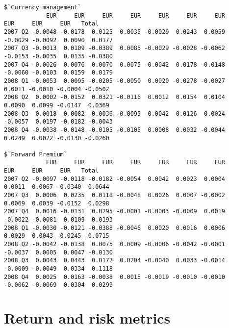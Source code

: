 \documentclass[11pt,a4paper]{article}
\begin{document}
\begin{verbatim}
$`Currency management`
            EUR     EUR     EUR     EUR     EUR     EUR     EUR     EUR     EUR     EUR   Total
2007 Q2 -0.0048 -0.0178  0.0125  0.0035 -0.0029  0.0243  0.0059 -0.0029 -0.0092  0.0090  0.0177
2007 Q3 -0.0013  0.0109 -0.0389  0.0085 -0.0029 -0.0028 -0.0062 -0.0153 -0.0035  0.0135 -0.0380
2007 Q4 -0.0026  0.0076  0.0070  0.0075 -0.0042  0.0178 -0.0148 -0.0060 -0.0103  0.0159  0.0179
2008 Q1 -0.0053  0.0095 -0.0205 -0.0050  0.0020 -0.0278 -0.0027  0.0011 -0.0010 -0.0004 -0.0502
2008 Q2  0.0002 -0.0152  0.0321 -0.0116  0.0012  0.0154  0.0104  0.0090  0.0099 -0.0147  0.0369
2008 Q3  0.0018 -0.0082 -0.0036 -0.0095  0.0042  0.0126  0.0024 -0.0057  0.0197 -0.0182 -0.0043
2008 Q4 -0.0038 -0.0148 -0.0105 -0.0105  0.0008  0.0032 -0.0044  0.0249  0.0022 -0.0130 -0.0260

$`Forward Premium`
            EUR     EUR     EUR     EUR     EUR     EUR     EUR     EUR     EUR     EUR   Total
2007 Q2 -0.0097 -0.0118 -0.0182 -0.0054  0.0042  0.0023  0.0004  0.0011  0.0067 -0.0340 -0.0644
2007 Q3  0.0006  0.0235  0.0118 -0.0048  0.0026  0.0007 -0.0002  0.0069  0.0039 -0.0152  0.0298
2007 Q4  0.0016 -0.0131  0.0295 -0.0001 -0.0003 -0.0009  0.0019 -0.0022 -0.0081  0.0109  0.0193
2008 Q1 -0.0030 -0.0121 -0.0388 -0.0046  0.0020  0.0016  0.0006  0.0029  0.0043 -0.0245 -0.0715
2008 Q2 -0.0042 -0.0138  0.0075  0.0009 -0.0006 -0.0042 -0.0001 -0.0037  0.0005  0.0047 -0.0130
2008 Q3  0.0043  0.0443  0.0172  0.0204 -0.0040  0.0033 -0.0014 -0.0009 -0.0049  0.0334  0.1118
2008 Q4  0.0025  0.0163 -0.0038  0.0015 -0.0019 -0.0010 -0.0010 -0.0062 -0.0069  0.0304  0.0299
\end{verbatim}
\endgroup

\section{Return and risk metrics}
\end{document}
